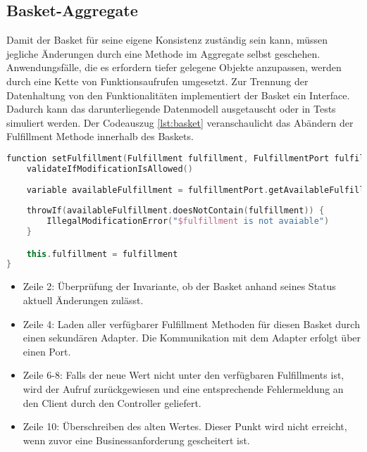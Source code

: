 \pagebreak

\subsection{Basket-Aggregate}

Damit der Basket für seine eigene Konsistenz zuständig sein kann, müssen jegliche Änderungen durch eine Methode im Aggregate selbst geschehen. Anwendungsfälle, die es erfordern tiefer gelegene Objekte anzupassen, werden durch eine Kette von Funktionsaufrufen umgesetzt. Zur Trennung der Datenhaltung von den Funktionalitäten implementiert der Basket ein Interface. Dadurch kann das darunterliegende Datenmodell ausgetauscht oder in Tests simuliert werden. Der Codeauszug \ref{lst:basket} veranschaulicht das Abändern der Fulfillment Methode innerhalb des Baskets.

\vspace{0.5cm}
\begin{minipage}{\linewidth} %
	\begin{lstlisting}[caption={Setzen der Fulfillment Methode im Basket Aggregate}, label={lst:basket}, language=Kotlin]
function setFulfillment(Fulfillment fulfillment, FulfillmentPort fulfillmentPort) {
	validateIfModificationIsAllowed()
	
	variable availableFulfillment = fulfillmentPort.getAvailableFulfillment(outletID)
	
	throwIf(availableFulfillment.doesNotContain(fulfillment)) {
		IllegalModificationError("$fulfillment is not avaiable")
	}

	this.fulfillment = fulfillment
}
	\end{lstlisting}


	\begin{itemize}
		\setlength\itemsep{-1pt}
		\item Zeile 2: Überprüfung der Invariante, ob der Basket anhand seines Status aktuell Änderungen zulässt.
		\item Zeile 4: Laden aller verfügbarer Fulfillment Methoden für diesen Basket durch einen sekundären Adapter. Die Kommunikation mit dem Adapter erfolgt über einen Port.
		\item Zeile 6-8: Falls der neue Wert nicht unter den verfügbaren Fulfillments ist, wird der Aufruf zurückgewiesen und eine entsprechende Fehlermeldung an den Client durch den Controller geliefert.
		\item Zeile 10: Überschreiben des alten Wertes. Dieser Punkt wird nicht erreicht, wenn zuvor eine Businessanforderung gescheitert ist.
	\end{itemize}
\end{minipage}

